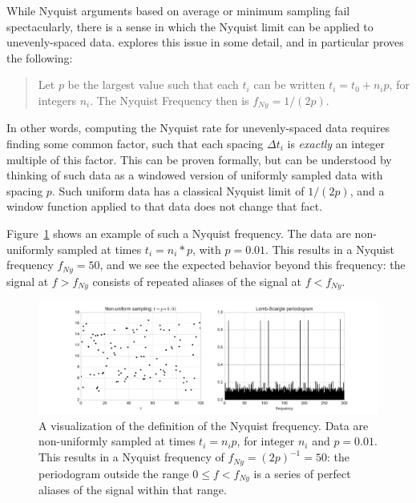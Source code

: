 \documentclass[preprint]{aastex}
\newcommand{\Fig}[1]{Figure~\ref{fig:#1}}
\newcommand{\figlabel}[1]{\label{fig:#1}}
\begin{document}
While Nyquist arguments based on average or minimum sampling fail spectacularly,
there is a sense in which the Nyquist limit can be applied to unevenly-spaced
data. \citet{Eyer99} explores this issue in some detail, and in particular
proves the following:
\begin{quote}
Let $p$ be the largest value such that each $t_i$ can be written $t_i = t_0 + n_i p$, for integers $n_i$. The Nyquist Frequency then is $f_{Ny} = 1 / (2p)$.
\end{quote}
In other words, computing the Nyquist rate for unevenly-spaced data requires
finding some common factor, such that each spacing $\Delta t_i$ is {\it exactly}
an integer multiple of this factor.
This can be proven formally, but can be understood by thinking of such data as
a windowed version of uniformly sampled data with spacing $p$.
Such uniform data has a classical Nyquist limit of $1/(2p)$, and a window function applied to that data does not change that fact.

\Fig{nyquist-eyer99} shows an example of such a Nyquist frequency.
The data are non-uniformly sampled at times $t_i = n_i * p$, with $p=0.01$.
This results in a Nyquist frequency $f_{Ny} = 50$, and we see the expected
behavior beyond this frequency: the signal at $f > f_{Ny}$ consists of repeated
aliases of the signal at $f < f_{Ny}$.

\begin{figure}[ht]
  \centering
  \includegraphics[width=\textwidth]{fig13_nyquist_eyer99}
  \caption{A visualization of the \citep{Eyer99} definition of the Nyquist
    frequency. Data are non-uniformly sampled at times $t_i = n_i p$, for
    integer $n_i$ and $p=0.01$.
    This results in a Nyquist frequency of $f_{Ny}= (2p)^{-1} = 50$:
    the periodogram outside the range $0 \le f < f_{Ny}$ is a series of
    perfect aliases of the signal within that range.
    \figlabel{nyquist-eyer99}}
\end{figure}
\end{document}

